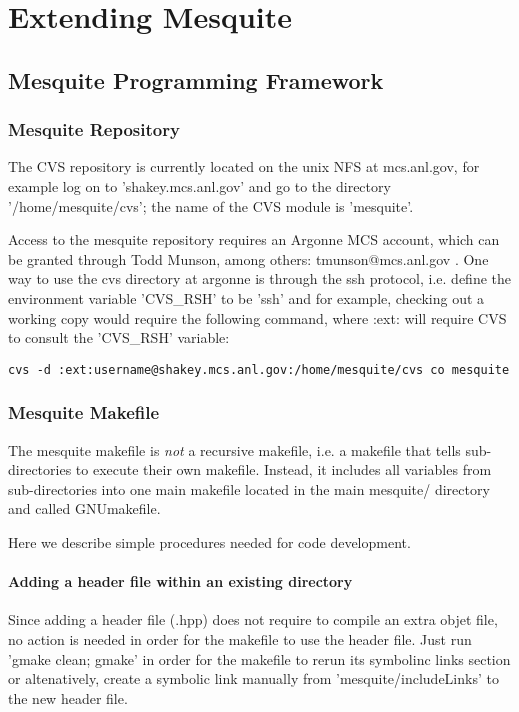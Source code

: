 \chapter{Extending Mesquite}  \label{sec:extensions}

\section{Mesquite Programming Framework}

\subsection{Mesquite Repository} 

The CVS repository is currently located on the unix NFS at mcs.anl.gov, for example log on to
'shakey.mcs.anl.gov' and go to the directory '/home/mesquite/cvs'; the name of the CVS module is
'mesquite'.

Access to the mesquite repository requires an Argonne MCS account, which can be granted through Todd
Munson, among others: tmunson@mcs.anl.gov .
One way to use the cvs directory at argonne is through the ssh protocol, i.e. define the environment
variable 'CVS\_RSH' to be 'ssh' and for example, checking out a working copy would require the
following command, where :ext: will require CVS to consult the 'CVS\_RSH' variable: 
\begin{verbatim}
cvs -d :ext:username@shakey.mcs.anl.gov:/home/mesquite/cvs co mesquite
\end{verbatim}

\subsection{Mesquite Makefile} 

The mesquite makefile is \emph{not} a recursive makefile, i.e. a makefile that tells sub-directories
to execute their own makefile. Instead, it includes all variables from sub-directories into one main
makefile located in the main mesquite/ directory and called GNUmakefile.

Here we describe simple procedures needed for code development.

\subsubsection{Adding a header file within an existing directory}

Since adding a header file (.hpp) does not require to compile an extra objet file, no action is
needed in order for the makefile to use the header file. Just run 'gmake clean; gmake' in order for
the makefile to rerun its symbolinc links section or altenatively, create a symbolic link manually from
'mesquite/includeLinks' to the new header file.

